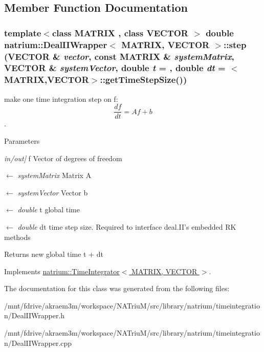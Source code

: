 \subsection{Member Function Documentation}
\hypertarget{classnatrium_1_1DealIIWrapper_a50227545e1fcff4c2d0f10a9c6eb3bca}{
\subsubsection[{step}]{\setlength{\rightskip}{0pt plus 5cm}template$<$class MATRIX , class VECTOR $>$ double {\bf natrium::DealIIWrapper}$<$ MATRIX, VECTOR $>$::step (VECTOR \& {\em vector}, \/  const MATRIX \& {\em systemMatrix}, \/  VECTOR \& {\em systemVector}, \/  double {\em t} = {}, \/  double {\em dt} = {$<$MATRIX,VECTOR$>$::getTimeStepSize()})}}
\label{classnatrium_1_1DealIIWrapper_a50227545e1fcff4c2d0f10a9c6eb3bca}


make one time integration step on f: \[ \frac{df}{dt} = Af+b \]. 
\begin{DoxyParams}{Parameters}
\item[{\em in/out\mbox{]}}]f Vector of degrees of freedom \item[\mbox{$\leftarrow$} {\em systemMatrix}]Matrix A \item[\mbox{$\leftarrow$} {\em systemVector}]Vector b \item[\mbox{$\leftarrow$} {\em double}]t global time \item[\mbox{$\leftarrow$} {\em double}]dt time step size. Required to interface deal.II's embedded RK methods \end{DoxyParams}
\begin{DoxyReturn}{Returns}
new global time t + dt 
\end{DoxyReturn}


Implements \hyperlink{classnatrium_1_1TimeIntegrator_a0237ebbaf737c7d3278777fb08007e99}{natrium::TimeIntegrator$<$ MATRIX, VECTOR $>$}.

The documentation for this class was generated from the following files:\begin{DoxyCompactItemize}
\item 
/mnt/fdrive/akraem3m/workspace/NATriuM/src/library/natrium/timeintegration/DealIIWrapper.h\item 
/mnt/fdrive/akraem3m/workspace/NATriuM/src/library/natrium/timeintegration/DealIIWrapper.cpp\end{DoxyCompactItemize}
